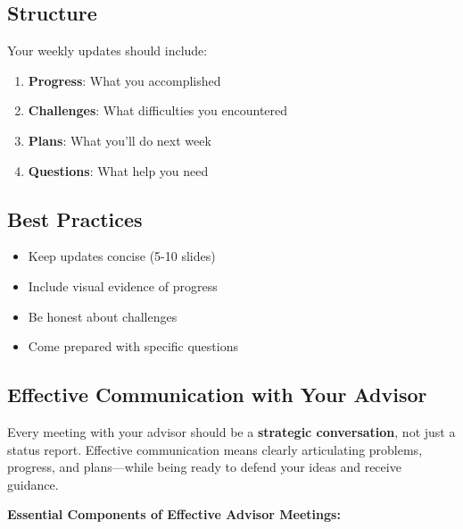 \documentclass[11pt,a4paper]{article}
\begin{document}
\subsection{Structure}
Your weekly updates should include:
\begin{enumerate}
    \item \textbf{Progress}: What you accomplished
    \item \textbf{Challenges}: What difficulties you encountered
    \item \textbf{Plans}: What you'll do next week
    \item \textbf{Questions}: What help you need
\end{enumerate}

\subsection{Best Practices}
\begin{itemize}
    \item Keep updates concise (5-10 slides)
    \item Include visual evidence of progress
    \item Be honest about challenges
    \item Come prepared with specific questions
\end{itemize}

\subsection{Effective Communication with Your Advisor}

\begin{tcolorbox}[colback=green!5,colframe=green!50,title={The Foundation of Productive Meetings}]
Every meeting with your advisor should be a \textbf{strategic conversation}, not just a status report. Effective communication means clearly articulating problems, progress, and plans—while being ready to defend your ideas and receive guidance.
\end{tcolorbox}

\textbf{Essential Components of Effective Advisor Meetings:}
\end{document}
